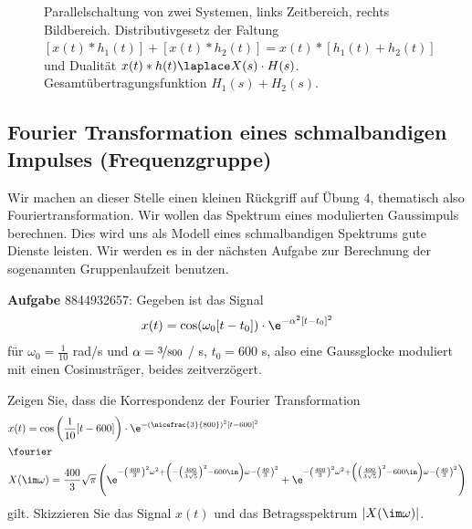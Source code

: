 \begin{figure}
\caption{Parallelschaltung von zwei Systemen, links Zeitbereich, rechts Bildbereich.
Distributivgesetz der Faltung
$[x(t)\ast h_1(t)]+[x(t) \ast h_2(t)] = x(t) \ast [h_1(t)+h_2(t)]$
und Dualität $x(t)\ast h(t) \laplace X(s) \cdot H(s)$.
Gesamtübertragungsfunktion $H_1(s) + H_2(s)$.}
\label{fig:tikz_parallel_081294E23C}
\end{figure}

















\clearpage
\subsection{Fourier Transformation eines schmalbandigen Impulses (Frequenzgruppe)}
\label{sec:8844932657}
\begin{Ziel}
Wir machen an dieser Stelle einen kleinen Rückgriff auf Übung 4, thematisch
also Fouriertransformation.
Wir wollen das Spektrum eines modulierten Gaussimpuls berechnen.
Dies wird uns als Modell eines schmalbandigen Spektrums gute
Dienste leisten.
Wir werden es in der nächsten Aufgabe zur Berechnung der sogenannten
Gruppenlaufzeit benutzen.
\end{Ziel}
\textbf{Aufgabe} {\tiny 8844932657}: Gegeben ist das Signal
\begin{align}
  x(t) = \cos(\omega_0 [t-t_0]) \cdot \e^{-\alpha^2 [t-t_0]^2}
\end{align}
für $\omega_0 = \frac{1}{10}$ rad/s und $\alpha=\nicefrac{3}{800}$ / s, $t_0 = 600$ s,
also eine Gaussglocke moduliert mit einen Cosinusträger, beides zeitverzögert.

Zeigen Sie, dass die Korrespondenz der Fourier Transformation
\begin{align}
  &x(t) = \cos\left(\frac{1}{10} [t-600]\right) \cdot \e^{-\left(\nicefrac{3}{800}\right)^2 [t-600]^2}\\
  &\fourier\nonumber\\
  &X(\im\omega) = \frac{400}{3}\sqrt{\pi}\left(
  \e^{-\left(\frac{400}{3}\right)^2 \omega^2 + \left(-\left(\frac{400}{3\sqrt{5}}\right)^2-600\im\right)\omega - \left(\frac{40}{3}\right)^2}+
  \e^{-\left(\frac{400}{3}\right)^2 \omega^2 + \left(\left(\frac{400}{3\sqrt{5}}\right)^2-600\im\right)\omega - \left(\frac{40}{3}\right)^2}\right)
\end{align}
gilt.
Skizzieren Sie das Signal $x(t)$ und das Betragsspektrum $|X(\im\omega)|$.


